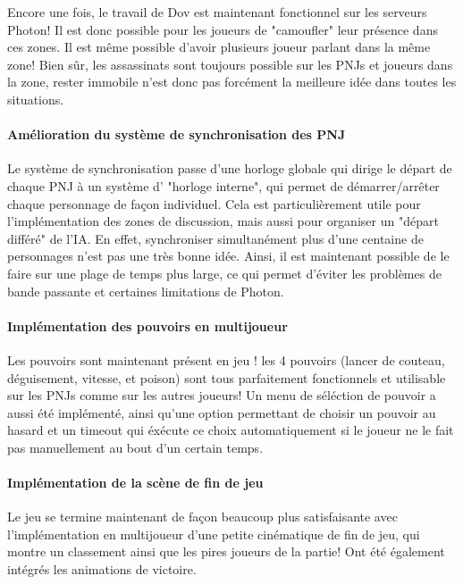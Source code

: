 			Encore une fois, le travail de Dov est maintenant fonctionnel sur les serveurs Photon! Il est donc possible pour les joueurs de "camoufler" leur présence dans ces zones.
			Il est même possible d'avoir plusieurs joueur parlant dans la même zone! Bien sûr, les assassinats sont toujours possible sur les PNJs et joueurs dans la zone, rester immobile
			n'est donc pas forcément la meilleure idée dans toutes les situations.
			
	    \paragraph{Amélioration du système de synchronisation des PNJ}
			
			Le système de synchronisation passe d'une horloge globale qui dirige le départ de chaque PNJ à un système d' "horloge interne", qui permet de démarrer/arrêter
			chaque personnage de façon individuel. Cela est particulièrement utile pour l'implémentation des zones de discussion, mais aussi pour organiser un "départ différé" de l'IA.
			En effet, synchroniser simultanément plus d'une centaine de personnages n'est pas une très bonne idée. Ainsi, il est maintenant possible de le faire sur une plage de temps
			plus large, ce qui permet d'éviter les problèmes de bande passante et certaines limitations de Photon.
		
		\paragraph{Implémentation des pouvoirs en multijoueur}
		
			Les pouvoirs sont maintenant présent en jeu ! les 4 pouvoirs (lancer de couteau, déguisement, vitesse, et poison) sont tous parfaitement fonctionnels et utilisable sur les PNJs
			comme sur les autres joueurs! Un menu de séléction de pouvoir a aussi été implémenté, ainsi qu'une option permettant de choisir un pouvoir au hasard et un timeout qui éxécute ce choix
			automatiquement si le joueur ne le fait pas manuellement au bout d'un certain temps.
			
		\paragraph{Implémentation de la scène de fin de jeu}
		
			Le jeu se termine maintenant de façon beaucoup plus satisfaisante avec l'implémentation en multijoueur d'une petite cinématique de fin de jeu, qui montre un classement ainsi
			que les pires joueurs de la partie! Ont été également intégrés les animations de victoire.
		
			
		
		